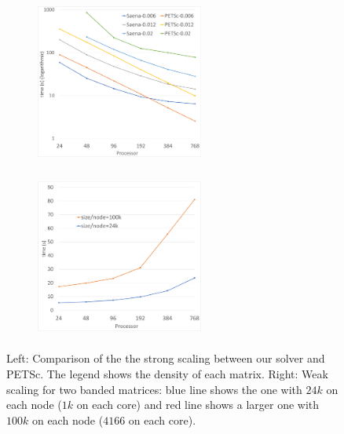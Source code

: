 \begin{figure}[tbh]
    \centering
    \begin{subfigure}{.45\textwidth}
        \centering
        \includegraphics[width=5.5cm,height=5.4cm]{./figures/strong_size_vs_petsc.pdf}
    \end{subfigure}
    \begin{subfigure}{.45\textwidth}
        \centering
        \includegraphics[width=5.5cm,height=5.4cm]{./figures/weak1.pdf}
    \end{subfigure}
    \caption{Left: Comparison of the the strong scaling between our solver and PETSc. The legend shows the density of each matrix. Right: Weak scaling for two banded matrices: blue line shows the one with $24k$ on each node ($1k$ on each core) and red line shows a larger one with $100k$ on each node ($4166$ on each core).}
    \label{fig:petsc1}
\end{figure}


